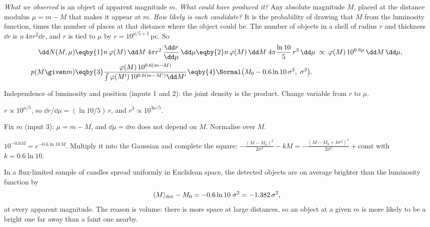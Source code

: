 \emph{What we observed} is an object of apparent magnitude $m$. \emph{What could have produced it?} Any absolute magnitude $M$, placed at the distance modulus $\mu=m-M$ that makes it appear at $m$. \emph{How likely is each candidate?} It is the probability of drawing that $M$ from the luminosity function, times the number of places at that distance where the object could be. The number of objects in a shell of radius $r$ and thickness $\dd r$ is $n\,4\pi r^2\dd r$, and $r$ is tied to $\mu$ by $r=10^{\mu/5+1}$\,pc. So
\begin{align}
  \dd N(M,\mu)
  &\eqby{1}n\,\varphi(M)\,\dd M\;4\pi r^2\,\frac{\dd r}{\dd\mu}\,\dd\mu
  \eqby{2}n\,\varphi(M)\,\dd M\;4\pi\frac{\ln10}{5}\,r^3\,\dd\mu
  \;\propto\;\varphi(M)\,10^{0.6\mu}\,\dd M\,\dd\mu ,\nonumber\\
  p(M\given m)
  &\eqby{3}\frac{\varphi(M)\,10^{0.6(m-M)}}{\int\varphi(M')\,10^{0.6(m-M')}\dd M'}
  \eqby{4}\Normal\big(M_0-0.6\ln10\,\sigma^2,\;\sigma^2\big).
  \label{T2b:eq:malmquist}
\end{align}
\begin{explain}
  \item Independence of luminosity and position (inputs 1 and 2): the joint density is the product. Change variable from $r$ to $\mu$.
  \item $r\propto10^{\mu/5}$, so $\dd r/\dd\mu=(\ln10/5)\,r$, and $r^3\propto10^{3\mu/5}$.
  \item Fix $m$ (input 3): $\mu=m-M$, and $\dd\mu=\dd m$ does not depend on $M$. Normalise over $M$.
  \item $10^{-0.6M}=e^{-0.6\ln10\,M}$. Multiply it into the Gaussian and complete the square: $-\frac{(M-M_0)^2}{2\sigma^2}-kM=-\frac{(M-M_0+k\sigma^2)^2}{2\sigma^2}+\text{const}$ with $k=0.6\ln10$.
\end{explain}

\begin{keyidea}
In a flux-limited sample of candles spread uniformly in Euclidean space, the detected objects are on average brighter than the luminosity function by
\[
  \langle M\rangle_{\rm det}-M_0=-0.6\ln10\;\sigma^2=-1.382\,\sigma^2 ,
\]
at every apparent magnitude. The reason is volume: there is more space at large distances, so an object at a given $m$ is more likely to be a bright one far away than a faint one nearby.
\end{keyidea}

